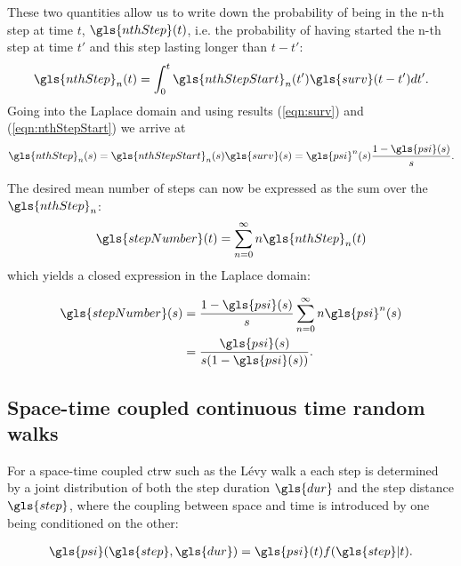 These two quantities allow us to write down the probability of being in the n-th step at time $t$, $\gls{nthStep}(t)$, i.e. the probability of having started the n-th step at time $t'$ and this step lasting longer than $t-t'$:
%
\begin{align}
\gls{nthStep}_n(t) = \int_{0}^{t} \gls{nthStepStart}_{n}(t') \gls{surv}(t-t') dt' .
\end{align}
%
Going into the Laplace domain and using results (\ref{eqn:surv}) and (\ref{eqn:nthStepStart}) we arrive at 
%
\begin{align}
\gls{nthStep}_n(s) =  \gls{nthStepStart}_{n}(s) \gls{surv}(s) = \gls{psi}^{n}(s)  \frac{1-\gls{psi}(s)}{s} .
\end{align}

The desired mean number of steps can now be expressed as the sum over the $\gls{nthStep}_n$:
%
\begin{align}
\gls{stepNumber}(t) = \sum_{n=0}^{\infty} n \gls{nthStep}_n(t)
\end{align}
%
which yields a closed expression in the Laplace domain:
%

\begin{align}
\gls{stepNumber}(s) & = \frac{1-\gls{psi}(s)}{s} \sum_{n=0}^{\infty} n \gls{psi}^{n}(s) \\
& =  \frac{\gls{psi}(s)}{s(1-\gls{psi}(s))} .
\end{align}





\subsection{Space-time coupled continuous time random walks}


For a space-time coupled \gls{ctrw} such as the L\'evy walk a each step is determined by a joint distribution of both the step duration $\gls{dur}$ and the step distance $\gls{step}$, where the coupling between space and time is introduced by one being conditioned on the other:

\begin{align}
\gls{psi}(\gls{step}, \gls{dur}) = \gls{psi}(t) f(\gls{step}|t) .
\end{align}

